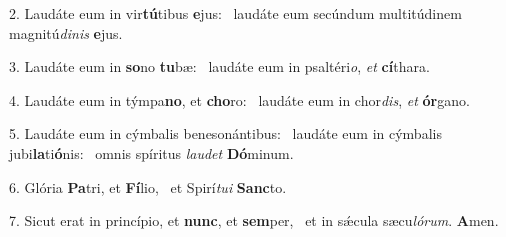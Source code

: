 2. Laudáte eum in vir\textbf{tú}tibus \textbf{e}jus: \ast\  laudáte eum secúndum multitúdinem magnitú\textit{di}\textit{nis} \textbf{e}jus.\

3. Laudáte eum in \textbf{so}no \textbf{tu}bæ: \ast\  laudáte eum in psaltéri\textit{o}, \textit{et} \textbf{cí}thara.\

4. Laudáte eum in týmpa\textbf{no}, et \textbf{cho}ro: \ast\  laudáte eum in chor\textit{dis}, \textit{et} \textbf{ór}gano.\

5. Laudáte eum in cýmbalis benesonántibus: \dag\  laudáte eum in cýmbalis jubi\textbf{la}ti\textbf{ó}nis: \ast\  omnis spíritus \textit{lau}\textit{det} \textbf{Dó}minum.\

6. Glória \textbf{Pa}tri, et \textbf{Fí}lio, \ast\  et Spirí\textit{tu}\textit{i} \textbf{Sanc}to.\

7. Sicut erat in princípio, et \textbf{nunc}, et \textbf{sem}per, \ast\  et in sǽcula sæcu\textit{ló}\textit{rum}. \textbf{A}men.\

